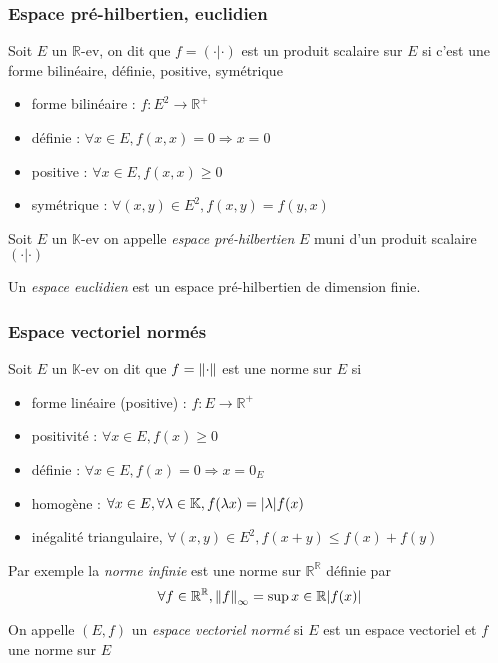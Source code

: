 \documentclass[11pt,colorlinks]{book}
\theoremstyle{mytheoremstyle}
\theoremstyle{mytheoremstyle}
\theoremstyle{mytheoremstyle}
\theoremstyle{mytheoremstyle}
\theoremstyle{mytheoremstyle}
\theoremstyle{mytheoremstyle}
\theoremstyle{mytheoremstyle}
\theoremstyle{mytheoremstyle}
\theoremstyle{myproblemstyle}
\def\mbb#1{\mathbb{#1}}
\def\bR{\mbb{R}}
\def\bK{\mbb{K}}
\begin{document}
\subsubsection{Espace pré-hilbertien, euclidien}
\begin{definition}
  Soit $E$ un $\bR$-ev, on dit que $f = (\cdot | \cdot)$ est un produit scalaire sur $E$ si c'est une forme bilinéaire, définie, positive, symétrique
  \begin{itemize}
    \item forme bilinéaire : $f : E^2 \to \bR^+$ 
    \item définie : $\forall x \in E, f(x,x) = 0 \Rightarrow x=0$
    \item positive : $\forall x \in E, f(x,x) \geq 0$ 
    \item symétrique : $\forall (x,y) \in E^2, f(x,y) = f(y,x)$
  \end{itemize}
\end{definition}
\begin{definition}
  Soit $E$ un $\bK$-ev on appelle \textit{espace pré-hilbertien} $E$ muni d'un produit scalaire $(\cdot | \cdot)$
\end{definition}
\begin{definition}
  Un \textit{espace euclidien} est un espace pré-hilbertien de dimension finie.
\end{definition}
\subsubsection{Espace vectoriel normés}
\begin{definition}
  Soit $E$ un $\bK$-ev on dit que $f = \norm{\cdot}$ est une norme sur $E$ si 
  \begin{itemize}
    \item forme linéaire (positive) : $f : E \to \bR^+$
    \item positivité : $\forall x \in E, f(x) \geq 0$ 
    \item définie : $\forall x \in E, f(x)=0 \Rightarrow x=0_E$
    \item homogène : $\forall x \in E, \forall \lambda \in \bK, f(\lambda x) = \abs{\lambda} f(x)$
    \item inégalité triangulaire, $\forall (x,y) \in E^2, f(x+y) \leq f(x) + f(y)$
  \end{itemize}
\end{definition}
\begin{ex}
  Par exemple la \textit{norme infinie} est une norme sur $\bR^{\bR}$ définie par 
  \begin{equation*}
    \forall f \in \bR^{\bR}, \norm{f}_{\infty} = \sup{x \in \bR} \abs{f(x)}
  \end{equation*}
\end{ex}
\begin{definition}
  On appelle $(E,f)$ un \textit{espace vectoriel normé} si $E$ est un espace vectoriel et $f$ une norme sur $E$
\end{definition}
\end{document}
